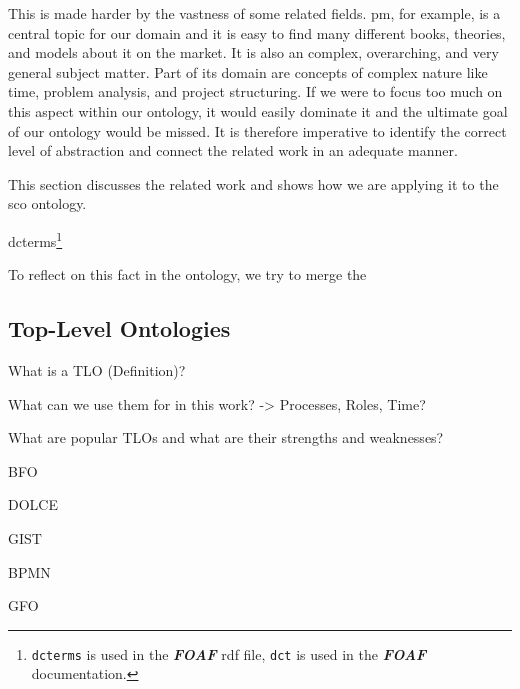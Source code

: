 \documentclass[a4paper, DIV=13, BCOR=0cm]{scrbook}
\newcommand{\pn}[1]{\textit{\textbf{#1}}}
\begin{document}
This is made harder by the vastness of some related fields. \gls{pm}, for example, is a central topic for our domain and it is easy to find many different books, theories, and models about it on the market. It is also an complex, overarching, and very general subject matter. Part of its domain are concepts of complex nature like time, problem analysis, and project structuring. If we were to focus too much on this aspect within our ontology, it would easily dominate it and the ultimate goal of our ontology would be  missed. It is therefore imperative to identify the correct level of abstraction and connect the related work in an adequate manner.

This section discusses the related work and shows how we are applying it to the \gls{sco} ontology.



dcterms\footnote{\texttt{dcterms} is used in the \pn{FOAF} rdf file, \texttt{dct} is used in the \pn{FOAF} documentation.}


To reflect on this fact in the ontology, we try to merge the 
\subsection{Top-Level Ontologies }
\begin{compactenum}
	\item What is a TLO (Definition)?
	\item What can we use them for in this work? -> Processes, Roles, Time?
	\item What are popular TLOs and what are their strengths and weaknesses?
	\begin{compactenum}
		\item BFO %
		\item DOLCE
		\item GIST
		\item BPMN  \cite{2014foisbpmn}
		\item GFO
	\end{compactenum}
\end{compactenum}
\end{document}
